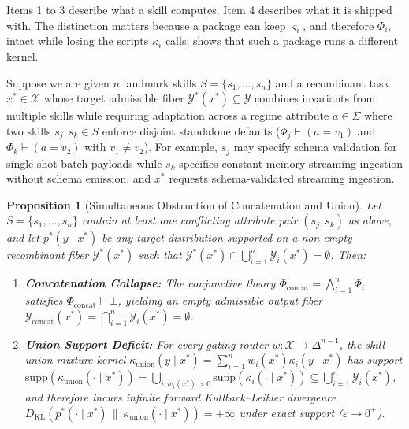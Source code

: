 \documentclass[11pt]{article}
\theoremstyle{definition}
\theoremstyle{plain}
\newtheorem{proposition}{Proposition}
\newcommand{\Xcal}{\mathcal{X}}
\newcommand{\Ycal}{\mathcal{Y}}
\newcommand{\KL}{D_{\mathrm{KL}}}
\begin{document}
Items 1 to 3 describe what a skill computes. Item 4 describes what it is shipped with. The distinction matters because a package can keep $\varsigma_i$, and therefore $\Phi_i$, intact while losing the scripts $\kappa_i$ calls;  shows that such a package runs a different kernel.

Suppose we are given $n$ landmark skills $S = \{s_1, \dots, s_n\}$ and a recombinant task $x^* \in \Xcal$ whose target admissible fiber $\Ycal^*(x^*) \subseteq \Ycal$ combines invariants from multiple skills while requiring adaptation across a regime attribute $a \in \Sigma$ where two skills $s_j, s_k \in S$ enforce disjoint standalone defaults ($\Phi_j \vdash (a = v_1)$ and $\Phi_k \vdash (a = v_2)$ with $v_1 \neq v_2$). For example, $s_j$ may specify schema validation for single-shot batch payloads while $s_k$ specifies constant-memory streaming ingestion without schema emission, and $x^*$ requests schema-validated streaming ingestion.

\begin{proposition}[Simultaneous Obstruction of Concatenation and Union]
\label{prop:impossibility}
Let $S = \{s_1, \dots, s_n\}$ contain at least one conflicting attribute pair $(s_j, s_k)$ as above, and let $p^*(y \mid x^*)$ be any target distribution supported on a non-empty recombinant fiber $\Ycal^*(x^*)$ such that $\Ycal^*(x^*) \cap \bigcup_{i=1}^n \Ycal_i(x^*) = \emptyset$. Then:
\begin{enumerate}[leftmargin=1.8em,itemsep=1pt,topsep=2pt]
  \item \textbf{Concatenation Collapse:} The conjunctive theory $\Phi_{\mathrm{concat}} = \bigwedge_{i=1}^n \Phi_i$ satisfies $\Phi_{\mathrm{concat}} \vdash \bot$, yielding an empty admissible output fiber $\Ycal_{\mathrm{concat}}(x^*) = \bigcap_{i=1}^n \Ycal_i(x^*) = \emptyset$.
  \item \textbf{Union Support Deficit:} For every gating router $w : \Xcal \to \Delta^{n-1}$, the skill-union mixture kernel $\kappa_{\mathrm{union}}(y \mid x^*) = \sum_{i=1}^n w_i(x^*) \kappa_i(y \mid x^*)$ has support $\mathrm{supp}(\kappa_{\mathrm{union}}(\cdot \mid x^*)) = \bigcup_{i : w_i(x^*) > 0} \mathrm{supp}(\kappa_i(\cdot \mid x^*)) \subseteq \bigcup_{i=1}^n \Ycal_i(x^*)$, and therefore incurs infinite forward Kullback--Leibler divergence $\KL(p^*(\cdot \mid x^*) \,\|\, \kappa_{\mathrm{union}}(\cdot \mid x^*)) = +\infty$ under exact support ($\varepsilon \to 0^+$).
\end{enumerate}
\end{proposition}
\end{document}
